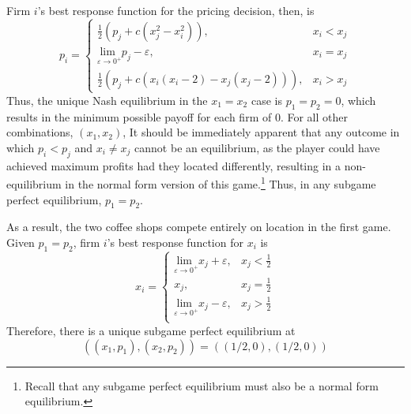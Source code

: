 \documentclass{article}
\begin{document}
Firm $i$'s best response function for the pricing decision, then, is 
\[
	p_i = 	\begin{cases}
				\frac{1}{2}\left(p_j + c(x_j^2 - x_i^2)\right), 					& x_i<x_j	\\
				\underset{\varepsilon\rightarrow0^+}{\text{lim }}p_j - \varepsilon,	& x_i=x_j 	\\
				\frac{1}{2}\left(p_j + c(x_i(x_i-2) - x_j(x_j-2))\right), 			& x_i>x_j
			\end{cases}
\]
Thus, the unique Nash equilibrium in the $x_1=x_2$ case is ${p_1=p_2=0}$, which results in the minimum possible payoff for each firm of 0. For all other combinations, $(x_1,x_2)$, It should be immediately apparent that any outcome in which ${p_i<p_j}$ and ${x_i\neq x_j}$ cannot be an equilibrium, as the player could have achieved maximum profits had they located differently, resulting in a non-equilibrium in the normal form version of this game.\footnote{Recall that any subgame perfect equilibrium must also be a normal form equilibrium.} Thus, in any subgame perfect equilibrium, ${p_1=p_2}$.

As a result, the two coffee shops compete entirely on location in the first game. Given ${p_1=p_2}$, firm $i$'s best response function for $x_i$ is
\[
	x_i = 	\begin{cases}
				\underset{\varepsilon\rightarrow0^+}{\text{lim }}x_j + \varepsilon, & x_j<\frac{1}{2}	\\
				x_j, 																& x_j=\frac{1}{2}	\\
				\underset{\varepsilon\rightarrow0^+}{\text{lim }}x_j - \varepsilon, & x_j>\frac{1}{2}	\\
			\end{cases}
\]
Therefore, there is a unique subgame perfect equilibrium at 
\[
	\left((x_1,p_1),(x_2,p_2)\right) = \left((1/2,0),(1/2,0)\right)
\]

	


\end{document}
